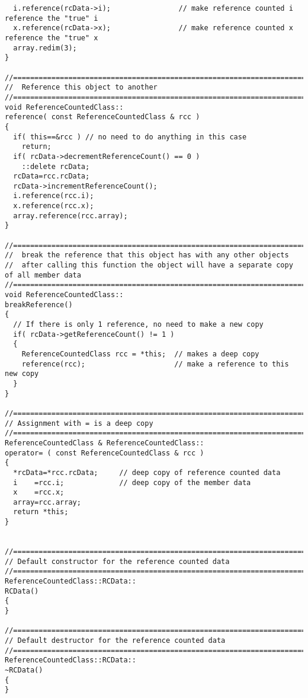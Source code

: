 {\begin{verbatim}
  i.reference(rcData->i);                // make reference counted i reference the "true" i
  x.reference(rcData->x);                // make reference counted x reference the "true" x
  array.redim(3);
}

//========================================================================================================
//  Reference this object to another
//========================================================================================================
void ReferenceCountedClass::
reference( const ReferenceCountedClass & rcc )
{
  if( this==&rcc ) // no need to do anything in this case
    return;
  if( rcData->decrementReferenceCount() == 0 )
    ::delete rcData;   
  rcData=rcc.rcData;
  rcData->incrementReferenceCount();
  i.reference(rcc.i);
  x.reference(rcc.x);
  array.reference(rcc.array);
}

//========================================================================================================
//  break the reference that this object has with any other objects
//  after calling this function the object will have a separate copy of all member data
//========================================================================================================
void ReferenceCountedClass::
breakReference()
{
  // If there is only 1 reference, no need to make a new copy
  if( rcData->getReferenceCount() != 1 )
  {
    ReferenceCountedClass rcc = *this;  // makes a deep copy
    reference(rcc);                     // make a reference to this new copy
  }
}

//========================================================================================================
// Assignment with = is a deep copy
//========================================================================================================
ReferenceCountedClass & ReferenceCountedClass::
operator= ( const ReferenceCountedClass & rcc )
{
  *rcData=*rcc.rcData;     // deep copy of reference counted data
  i    =rcc.i;             // deep copy of the member data
  x    =rcc.x;
  array=rcc.array;
  return *this;
}


//========================================================================================================
// Default constructor for the reference counted data
//========================================================================================================
ReferenceCountedClass::RCData::
RCData()
{
}

//========================================================================================================
// Default destructor for the reference counted data
//========================================================================================================
ReferenceCountedClass::RCData::
~RCData()
{
}


\end{verbatim}}
